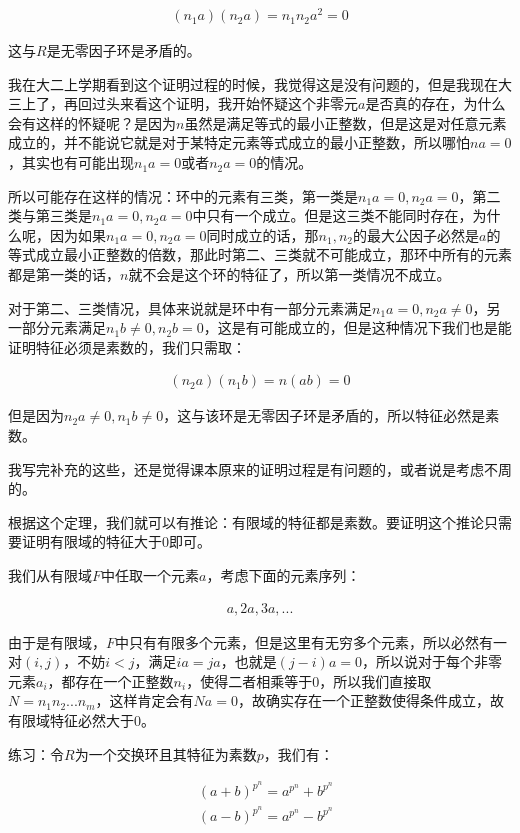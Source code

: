 \documentclass[12pt, a4paper, oneside]{ctexart}
\theoremstyle{definition}
\begin{document}
\begin{align*}
(n_1a)(n_2a)=n_1n_2a^2=0
\end{align*}

这与$R$是无零因子环是矛盾的。

我在大二上学期看到这个证明过程的时候，我觉得这是没有问题的，但是我现在大三上了，再回过头来看这个证明，我开始怀疑这个非零元$a$是否真的存在，为什么会有这样的怀疑呢？是因为$n$虽然是满足等式的最小正整数，但是这是对任意元素成立的，并不能说它就是对于某特定元素等式成立的最小正整数，所以哪怕$na=0$，其实也有可能出现$n_1a=0$或者$n_2a=0$的情况。

所以可能存在这样的情况：环中的元素有三类，第一类是$n_1a= 0,n_2a= 0$，第二类与第三类是$n_1a=0,n_2a=0$中只有一个成立。但是这三类不能同时存在，为什么呢，因为如果$n_1a= 0,n_2a= 0$同时成立的话，那$n_1,n_2$的最大公因子必然是$a$的等式成立最小正整数的倍数，那此时第二、三类就不可能成立，那环中所有的元素都是第一类的话，$n$就不会是这个环的特征了，所以第一类情况不成立。

对于第二、三类情况，具体来说就是环中有一部分元素满足$n_1a=0,n_2a\neq 0$，另一部分元素满足$n_1b\neq0,n_2b=0$，这是有可能成立的，但是这种情况下我们也是能证明特征必须是素数的，我们只需取：

\begin{align*}
(n_2a)(n_1b)=n(ab)=0
\end{align*}

但是因为$n_2a\neq 0,n_1b\neq0$，这与该环是无零因子环是矛盾的，所以特征必然是素数。

我写完补充的这些，还是觉得课本原来的证明过程是有问题的，或者说是考虑不周的。

根据这个定理，我们就可以有推论：有限域的特征都是素数。要证明这个推论只需要证明有限域的特征大于0即可。

我们从有限域$F$中任取一个元素$a$，考虑下面的元素序列：

\begin{align*}
a,2a,3a,...
\end{align*}

由于是有限域，$F$中只有有限多个元素，但是这里有无穷多个元素，所以必然有一对$(i,j)$，不妨$i<j$，满足$ia=ja$，也就是$(j-i)a=0$，所以说对于每个非零元素$a_i$，都存在一个正整数$n_i$，使得二者相乘等于0，所以我们直接取$N=n_1n_2...n_m$，这样肯定会有$Na=0$，故确实存在一个正整数使得条件成立，故有限域特征必然大于0。

练习：令$R$为一个交换环且其特征为素数$p$，我们有：

\begin{align*}
&(a+b)^{p^n}=a^{p^n}+b^{p^n}\\
&(a-b)^{p^n}=a^{p^n}-b^{p^n}\\
\end{align*}
\end{document}
